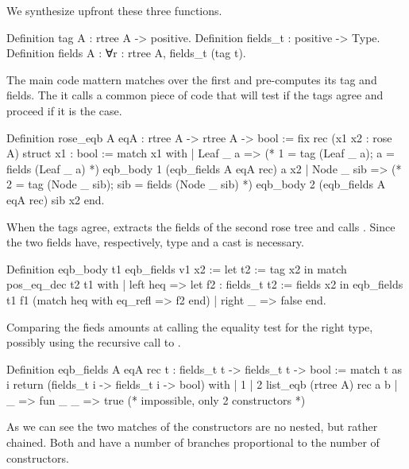 \documentclass[a4paper, 11pt]{book}
\begin{document}
We synthesize upfront these three functions.

\begin{coqcode}
Definition tag A : rtree A -> positive.
Definition fields_t : positive -> Type.
Definition fields A :  ∀r : rtree A, fields_t (tag t).
\end{coqcode}

The main code mattern matches over the first  and 
pre-computes its tag and fields. The it calls a common piece of
code  that will test if the tags agree and proceed
if it is the case.

\begin{coqcode}
Definition rose_eqb A eqA : rtree A -> rtree A -> bool := 
  fix rec (x1 x2 : rose A) {struct x1} : bool :=
    match x1 with
    | Leaf _ a =>
        (* 1 = tag (Leaf _ a); a = fields (Leaf _ a) *)
        eqb_body 1 (eqb_fields A eqA rec) a x2
    | Node _ sib =>            
        (* 2 = tag (Node _ sib); sib = fields (Node _ sib) *)
        eqb_body 2 (eqb_fields A eqA rec) sib x2
    end.
\end{coqcode}

When the tags agree,  extracts the fields
of the second rose tree and calls .
Since the two fields have, respectively, type 
 and  a cast is necessary.

\begin{coqcode}
Definition eqb_body t1 eqb_fields v1 x2 :=
  let t2 := tag x2 in
  match pos_eq_dec t2 t1 with
  | left heq =>
    let f2 : fields_t t2 := fields x2 in
    eqb_fields t1 f1 (match heq with eq_refl => f2 end)
  | right _ => false
  end.
\end{coqcode}

Comparing the fieds amounts at calling the equality test for the
right type, possibly using the recursive call to .

\begin{coqcode}
Definition eqb_fields A eqA rec t :
  fields_t t -> fields_t t -> bool
:=
  match t as i return (fields_t i -> fields_t i -> bool) with
  | 1%
  | 2%
                    list_eqb (rtree A) rec a b
  | _ => fun _ _ => true (* impossible, only 2 constructors *)
\end{coqcode}

As we can see the two matches of the constructors are no nested, but rather
chained. Both  and  have a number
of branches proportional to the number of constructors.
\end{document}
